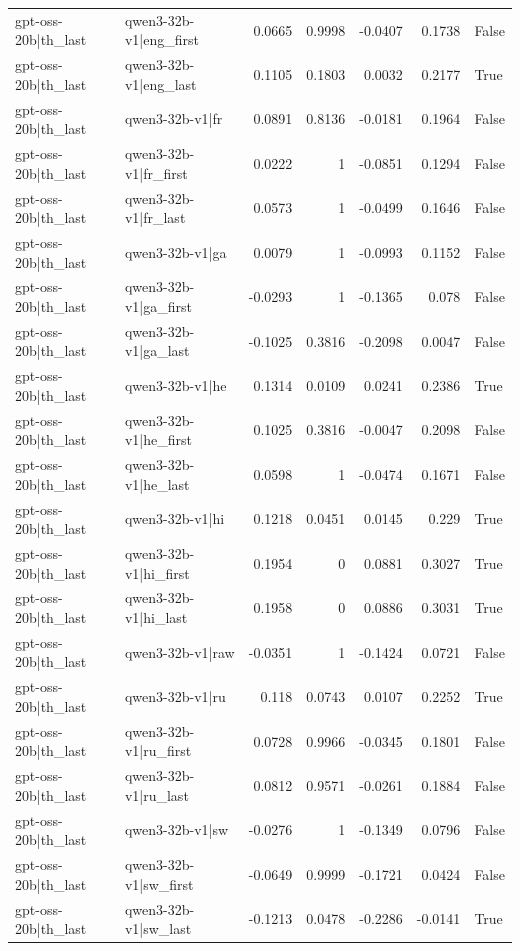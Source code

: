 \begin{table}
\begin{tabular}{l l r r r r l}
gpt-oss-20b|th_last & qwen3-32b-v1|eng_first & 0.0665 & 0.9998 & -0.0407 & 0.1738 & False \\
gpt-oss-20b|th_last & qwen3-32b-v1|eng_last & 0.1105 & 0.1803 & 0.0032 & 0.2177 & True \\
gpt-oss-20b|th_last & qwen3-32b-v1|fr & 0.0891 & 0.8136 & -0.0181 & 0.1964 & False \\
gpt-oss-20b|th_last & qwen3-32b-v1|fr_first & 0.0222 & 1 & -0.0851 & 0.1294 & False \\
gpt-oss-20b|th_last & qwen3-32b-v1|fr_last & 0.0573 & 1 & -0.0499 & 0.1646 & False \\
gpt-oss-20b|th_last & qwen3-32b-v1|ga & 0.0079 & 1 & -0.0993 & 0.1152 & False \\
gpt-oss-20b|th_last & qwen3-32b-v1|ga_first & -0.0293 & 1 & -0.1365 & 0.078 & False \\
gpt-oss-20b|th_last & qwen3-32b-v1|ga_last & -0.1025 & 0.3816 & -0.2098 & 0.0047 & False \\
gpt-oss-20b|th_last & qwen3-32b-v1|he & 0.1314 & 0.0109 & 0.0241 & 0.2386 & True \\
gpt-oss-20b|th_last & qwen3-32b-v1|he_first & 0.1025 & 0.3816 & -0.0047 & 0.2098 & False \\
gpt-oss-20b|th_last & qwen3-32b-v1|he_last & 0.0598 & 1 & -0.0474 & 0.1671 & False \\
gpt-oss-20b|th_last & qwen3-32b-v1|hi & 0.1218 & 0.0451 & 0.0145 & 0.229 & True \\
gpt-oss-20b|th_last & qwen3-32b-v1|hi_first & 0.1954 & 0 & 0.0881 & 0.3027 & True \\
gpt-oss-20b|th_last & qwen3-32b-v1|hi_last & 0.1958 & 0 & 0.0886 & 0.3031 & True \\
gpt-oss-20b|th_last & qwen3-32b-v1|raw & -0.0351 & 1 & -0.1424 & 0.0721 & False \\
gpt-oss-20b|th_last & qwen3-32b-v1|ru & 0.118 & 0.0743 & 0.0107 & 0.2252 & True \\
gpt-oss-20b|th_last & qwen3-32b-v1|ru_first & 0.0728 & 0.9966 & -0.0345 & 0.1801 & False \\
gpt-oss-20b|th_last & qwen3-32b-v1|ru_last & 0.0812 & 0.9571 & -0.0261 & 0.1884 & False \\
gpt-oss-20b|th_last & qwen3-32b-v1|sw & -0.0276 & 1 & -0.1349 & 0.0796 & False \\
gpt-oss-20b|th_last & qwen3-32b-v1|sw_first & -0.0649 & 0.9999 & -0.1721 & 0.0424 & False \\
gpt-oss-20b|th_last & qwen3-32b-v1|sw_last & -0.1213 & 0.0478 & -0.2286 & -0.0141 & True \\

\end{tabular}
\end{table}
